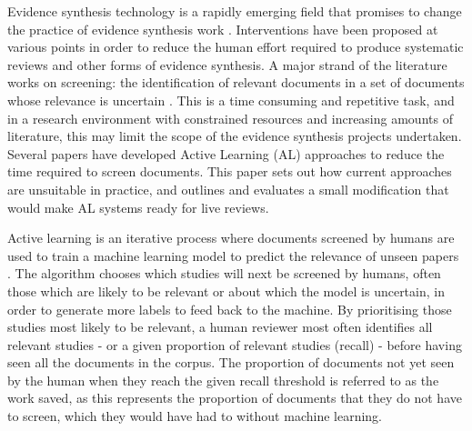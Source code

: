 \documentclass{bmcart}
\begin{document}
	Evidence synthesis technology is a rapidly emerging field that promises to change the practice of evidence synthesis work \cite{Westgate2018}.
	Interventions have been proposed at various points in order to reduce the human effort required to produce systematic reviews and other forms of evidence synthesis.
	A major strand of the literature works on screening: the identification of relevant documents in a set of documents whose relevance is uncertain \cite{OMara-Eves2015}. 
	This is a time consuming and repetitive task, and in a research environment with constrained resources and increasing amounts of literature, this may limit the scope of the evidence synthesis projects undertaken.
	Several papers have developed Active Learning (AL) approaches \cite{miwa2014, Wallace2010a, Wallace2010, Jonnalagadda2013, Przybya2018} to reduce the time required to screen documents. This paper sets out how current approaches are  unsuitable in practice, and outlines and evaluates a small modification that would make AL systems ready for live reviews.
	
	Active learning is an iterative process where documents screened by humans are used to train a machine learning model to predict the relevance of unseen papers \cite{Settles2009}.
	The algorithm chooses which studies will next be screened by humans, often those which are likely to be relevant or about which the model is uncertain, in order to generate more labels to feed back to the machine. 
	By prioritising those studies most likely to be relevant, a human reviewer most often identifies all relevant studies - or a given proportion of relevant studies (recall) - before having seen all the documents in the corpus. 
	The proportion of documents not yet seen by the human when they reach the given recall threshold is referred to as the work saved, as this represents the proportion of documents that they do not have to screen, which they would have had to without machine learning.
	
\end{document}
